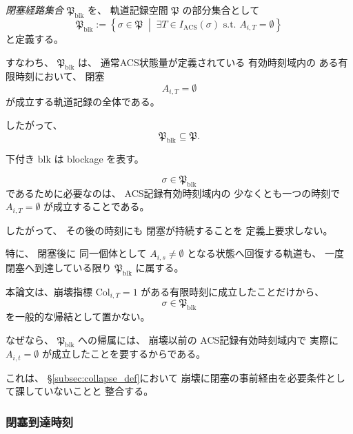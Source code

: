 \begin{definition}
\label{def:blk_path_set}
\emph{閉塞経路集合}
$\mathfrak{P}_{\mathrm{blk}}$
を、
軌道記録空間
$\mathfrak{P}$
の部分集合として
\[
  \mathfrak{P}_{\mathrm{blk}}
  :=
  \left\{
    \sigma\in\mathfrak{P}
    \;\middle|\;
    \exists T\in I_{\mathrm{ACS}}(\sigma)
    \text{ s.t. }
    A_{i,T}=\emptyset
  \right\}
\]
と定義する。

すなわち、
$\mathfrak{P}_{\mathrm{blk}}$
は、
通常ACS状態量が定義されている
有効時刻域内の
ある有限時刻において、
閉塞
\[
  A_{i,T}=\emptyset
\]
が成立する軌道記録の全体である。

したがって、
\[
  \mathfrak{P}_{\mathrm{blk}}
  \subseteq
  \mathfrak{P}.
\]

下付き
$\mathrm{blk}$
は
blockage
を表す。
\end{definition}

\begin{remark}[閉塞経路集合は閉塞の持続を要求しない]
\label{rem:blk_path_no_persistence}
\[
  \sigma\in\mathfrak{P}_{\mathrm{blk}}
\]
であるために必要なのは、
ACS記録有効時刻域内の
少なくとも一つの時刻で
$A_{i,T}=\emptyset$
が成立することである。

したがって、
その後の時刻にも
閉塞が持続することを
定義上要求しない。

特に、
閉塞後に
同一個体として
$A_{i,s}\neq\emptyset$
となる状態へ回復する軌道も、
一度閉塞へ到達している限り
$\mathfrak{P}_{\mathrm{blk}}$
に属する。
\end{remark}

\begin{remark}[崩壊と閉塞経路集合への帰属の関係]
\label{rem:collapse_not_blk_membership}
本論文は、崩壊指標
$\mathrm{Col}_{i,T}=1$
がある有限時刻に成立したことだけから、
\[
  \sigma\in\mathfrak{P}_{\mathrm{blk}}
\]
を一般的な帰結として置かない。

なぜなら、
$\mathfrak{P}_{\mathrm{blk}}$
への帰属には、
崩壊以前の
ACS記録有効時刻域内で
実際に
$A_{i,t}=\emptyset$
が成立したことを要するからである。

これは、
\S\ref{subsec:collapse_def}において
崩壊に閉塞の事前経由を必要条件として課していないことと
整合する。
\end{remark}

\subsubsection{閉塞到達時刻}

